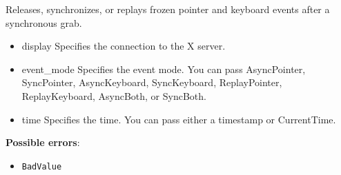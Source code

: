 \documentclass{report}
\begin{document}
\begin{itemize}
            \bigbreak \noindent
            Releases, synchronizes, or replays frozen pointer and keyboard events after a synchronous grab.
            \begin{itemize}
                \item display Specifies the connection to the X server.
                \item event\_mode Specifies the event mode. You can pass AsyncPointer, SyncPointer, AsyncKeyboard, SyncKeyboard, ReplayPointer, ReplayKeyboard, AsyncBoth, or SyncBoth.
                \item time Specifies the time. You can pass either a timestamp or CurrentTime.
            \end{itemize}
            \textbf{Possible errors}:
            \begin{itemize}
                \item \texttt{BadValue}
            \end{itemize}


\end{itemize}
\end{document}
